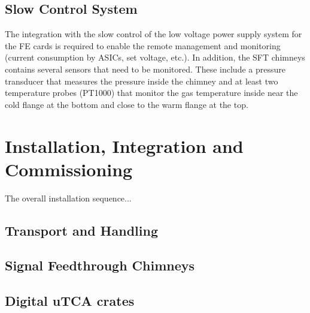 
\subsection{Slow Control System}
\label{sec:fddp-tpc-elec-intfc-sc}

The integration with the slow control of the low voltage power supply system for the FE cards is required to enable the remote management and monitoring (current consumption by ASICs, set voltage, etc.). In addition, the SFT chimneys contains several sensors that need to be monitored. These include a pressure transducer that measures the pressure inside the chimney and at least two temperature probes (PT1000) that monitor the gas temperature inside near the cold flange at the bottom and close to the warm flange at the top.  


\section{Installation, Integration and Commissioning}
\label{sec:fddp-tpc-elec-install}

The overall installation sequence...

\subsection{Transport and Handling}
\label{sec:fddp-tpc-elec-install-transport}

\subsection{Signal Feedthrough Chimneys}
\label{sec:fddp-tpc-elec-install-sft}

\subsection{Digital uTCA crates}
\label{sec:fddp-tpc-elec-install-utca}


